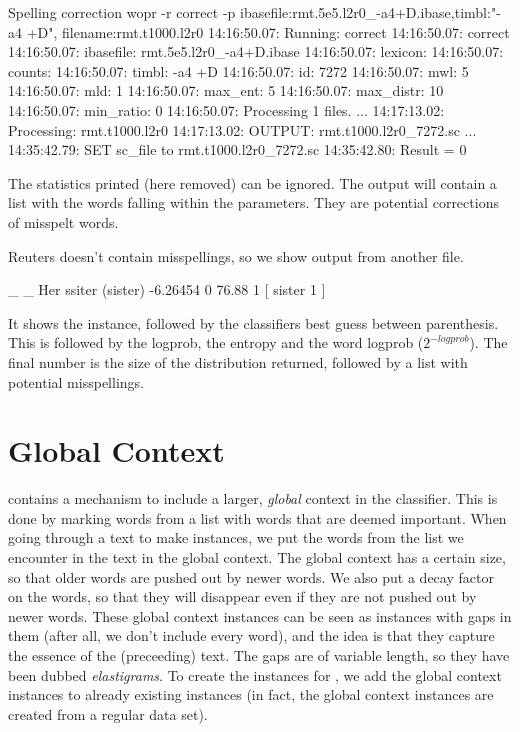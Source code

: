 \documentclass[a4paper,10pt,twoside]{report}
\begin{document}
\begin{bash}{Spelling correction}
wopr -r correct -p ibasefile:rmt.5e5.l2r0_-a4+D.ibase,timbl:"-a4 +D",
                   filename:rmt.t1000.l2r0
14:16:50.07: Running: correct
14:16:50.07: correct
14:16:50.07:  ibasefile:  rmt.5e5.l2r0_-a4+D.ibase
14:16:50.07:  lexicon:    
14:16:50.07:  counts:     
14:16:50.07:  timbl:      -a4 +D
14:16:50.07:  id:         7272
14:16:50.07:  mwl:        5
14:16:50.07:  mld:        1
14:16:50.07:  max_ent:    5
14:16:50.07:  max_distr:  10
14:16:50.07:  min_ratio:  0
14:16:50.07: Processing 1 files.
...
14:17:13.02: Processing: rmt.t1000.l2r0
14:17:13.02: OUTPUT:     rmt.t1000.l2r0_7272.sc
...
14:35:42.79:  SET sc_file to rmt.t1000.l2r0_7272.sc
14:35:42.80: Result = 0
\end{bash}

The statistics printed (here removed) can be ignored. The output will
contain a list with the words falling within the parameters. They are
potential corrections of misspelt words.

Reuters doesn't contain misspellings, so we show output from another
file.

\begin{wout}{}
_ _ Her ssiter (sister) -6.26454 0 76.88 1 [ sister 1 ]
\end{wout}

It shows the instance, followed by the classifiers best guess between
parenthesis. This is followed by the logprob, the entropy and the word
logprob ($2^{-logprob}$). The final number is the size of the \Timbl{}
distribution returned, followed by a list with potential misspellings.

\section{Global Context}

\Wopr{} contains a mechanism to include a larger, \emph{global}
context in the classifier. This is done by marking words from a list
with words that are deemed important. When going through a text to
make instances, we put the words from the list we encounter in the
text in the global context. The global context has a certain size, so
that older words are pushed out by newer words. We also put a decay
factor on the words, so that they will disappear even if they are not
pushed out by newer words. These global context instances can be seen
as instances with gaps in them (after all, we don't include every
word), and the idea is that they capture the essence of the
(preceeding) text. The gaps are of variable length, so they have been
dubbed \emph{elastigrams}. To create the instances for \Timbl{}, we
add the global context instances to already existing 
instances (in fact, the global context instances are created from a
regular data set).
\end{document}
